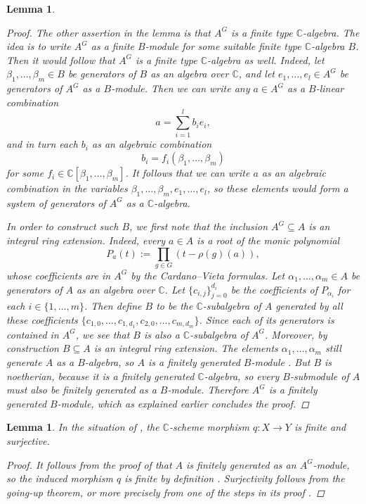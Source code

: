 \documentclass[12pt,a4paper]{amsart}
\theoremstyle{plain}
\newtheorem{lm}[thm]{Lemma}
\theoremstyle{definition}
\theoremstyle{remark}
\begin{document}
\begin{lm}
\begin{proof}
    The other assertion in the lemma is that $A^{G}$ is a finite type $\mathbb{C}$-algebra.
    The idea is to write $A^{G}$ as a finite $B$-module for some suitable finite type $\mathbb{C}$-algebra $B$.
    Then it would follow that $A^{G}$ is a finite type $\mathbb{C}$-algebra as well.
    Indeed, let $\beta_{1}, \ldots, \beta_{m} \in B$ be generators of $B$ as an algebra over $\mathbb{C}$, and let $e_{1}, \ldots, e_{l} \in A^{G}$ be generators of $A^{G}$ as a $B$-module.
    Then we can write any $a \in A^{G}$ as a $B$-linear combination
    \[ a = \sum_{i = 1}^{l} b_{i}e_{i}, \]
    and in turn each $b_{i}$ as an algebraic combination
    \[ b_{i} = f_{i}(\beta_{1}, \ldots, \beta_{m}) \]
    for some $f_{i} \in \mathbb{C}[\beta_{1}, \ldots, \beta_{m}]$.
    It follows that we can write $a$ as an algebraic combination in the variables $\beta_{1}, \ldots, \beta_{m}, e_{1}, \ldots, e_{l}$, so these elements would form a system of generators of $A^{G}$ as a $\mathbb{C}$-algebra.

    In order to construct such $B$, we first note that the inclusion $A^{G} \subseteq A$ is an integral ring extension.
    Indeed, every $a \in A$ is a root of the monic polynomial
    \[ P_{a}(t) := \prod_{g \in G}(t - \rho(g)(a)), \]
    whose coefficients are in $A^{G}$ by the Cardano--Vieta formulas.
    Let $\alpha_{1}, \ldots, \alpha_{m} \in A$ be generators of $A$ as an algebra over $\mathbb{C}$.
    Let $\{ c_{i,j} \}_{j = 0}^{d_{i}}$ be the coefficients of $P_{\alpha_{i}}$ for each $i \in \{1, \ldots, m\}$.
    Then define $B$ to be the $\mathbb{C}$-subalgebra of $A$ generated by all these coefficients $\{ c_{1,0}, \ldots, c_{1,d_{1}}, c_{2,0}, \ldots, c_{m,d_{m}} \}$.
    Since each of its generators is contained in $A^{G}$, we see that $B$ is also a $\mathbb{C}$-subalgebra of $A^{G}$.
    Moreover, by construction $B \subseteq A$ is an integral ring extension.
    The elements $\alpha_{1}, \ldots, \alpha_{m}$ still generate $A$ as a $B$-algebra, so $A$ is a finitely generated $B$-module \cite[Corollary 5.2]{am69}.
    But $B$ is noetherian, because it is a finitely generated $\mathbb{C}$-algebra, so every $B$-submodule of $A$ must also be finitely generated as a $B$-module.
    Therefore $A^{G}$ is a finitely generated $B$-module, which as explained earlier concludes the proof.
  \end{proof}

\end{lm}

\begin{lm}\label{lm:finitesurjective}
  In the situation of , the $\mathbb{C}$-scheme morphism $q \colon X \to Y$ is finite and surjective.

  \begin{proof}
    It follows from the proof of  that $A$ is finitely generated as an $A^{G}$-module, so the induced morphism $q$ is finite by definition \cite[p.~84]{har77}.
    Surjectivity follows from the going-up theorem, or more precisely from one of the steps in its proof \cite[Theorem 5.10]{am69}.
  \end{proof}
\end{lm}
\end{document}
